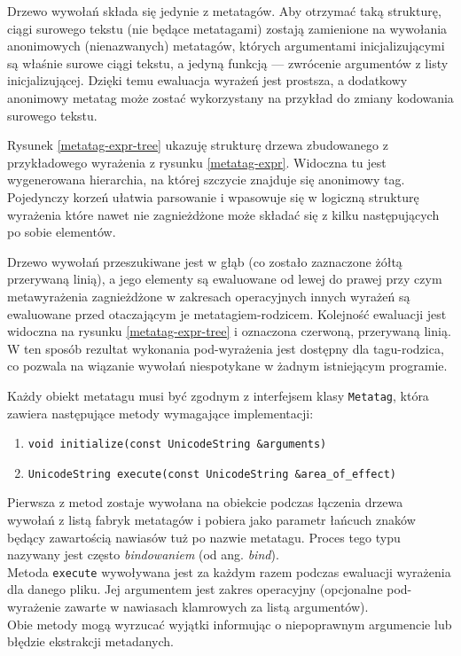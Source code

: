 \par
Drzewo wywołań składa się jedynie z metatagów. Aby otrzymać taką strukturę, ciągi surowego tekstu (nie będące metatagami) zostają zamienione na wywołania anonimowych (nienazwanych) metatagów, których argumentami inicjalizującymi są właśnie surowe ciągi tekstu, a jedyną funkcją --- zwrócenie argumentów z listy inicjalizującej. Dzięki temu ewaluacja wyrażeń jest prostsza, a dodatkowy anonimowy metatag może zostać wykorzystany na przykład do zmiany kodowania surowego tekstu.
\par
Rysunek \ref{metatag-expr-tree} ukazuję strukturę drzewa zbudowanego z przykładowego wyrażenia z rysunku \ref{metatag-expr}. Widoczna tu jest wygenerowana hierarchia, na której szczycie znajduje się anonimowy tag. Pojedynczy korzeń ułatwia parsowanie i wpasowuje się w logiczną strukturę wyrażenia które nawet nie zagnieżdżone może składać się z kilku następujących po sobie elementów.
\par
Drzewo wywołań przeszukiwane jest w głąb (co zostało zaznaczone żółtą przerywaną linią), a jego elementy są ewaluowane od lewej do prawej przy czym metawyrażenia zagnieżdżone w zakresach operacyjnych innych wyrażeń są ewaluowane przed otaczającym je metatagiem-rodzicem. Kolejność ewaluacji jest widoczna na rysunku \ref{metatag-expr-tree} i oznaczona czerwoną, przerywaną linią.  W ten sposób rezultat wykonania pod-wyrażenia jest dostępny dla tagu-rodzica, co pozwala na wiązanie wywołań niespotykane w żadnym istniejącym programie.
\par
Każdy obiekt metatagu musi być zgodnym z interfejsem klasy \texttt{Metatag}, która zawiera następujące metody wymagające implementacji:
\begin{enumerate}
\item \texttt{void initialize(const UnicodeString \&arguments)}
\item \texttt{UnicodeString execute(const UnicodeString \&area\_of\_effect)}
\end{enumerate}

Pierwsza z metod zostaje wywołana na obiekcie podczas łączenia drzewa wywołań z listą fabryk metatagów i pobiera jako parametr łańcuch znaków będący zawartością nawiasów tuż po nazwie metatagu. Proces tego typu nazywany jest często \textit{bindowaniem} (od ang. \textit{bind}).\\
Metoda \texttt{execute} wywoływana jest za każdym razem podczas ewaluacji wyrażenia dla danego pliku. Jej argumentem jest zakres operacyjny (opcjonalne pod-wyrażenie zawarte w nawiasach klamrowych za listą argumentów).\\
Obie metody mogą wyrzucać wyjątki informując o niepoprawnym argumencie lub błędzie ekstrakcji metadanych.

